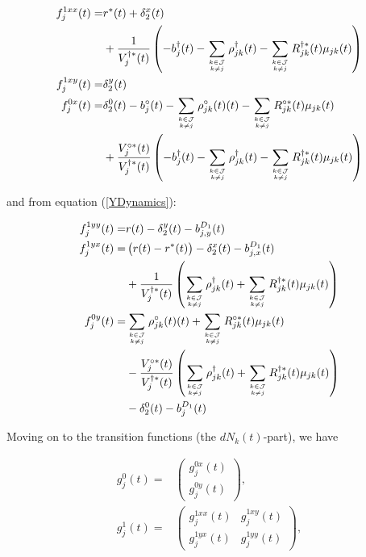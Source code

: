 \documentclass{article}
\newcommand{\1}[1]{\mathbbm{1}_{\left\lbrace #1 \right\rbrace}}
\theoremstyle{break}
\theoremstyle{remark}
\numberwithin{equation}{section}
\begin{document}
\begin{appendices}
\begin{align*}
	f_j^{1xx}(t) =& r^*(t) + \delta_2^x(t) \\
	&+ \frac{1}{V_j^{\dagger *}(t)} \left( -b_j^\dagger(t) - \sum_{k \in \mathcal{J} \atop k \neq j} \rho_{jk}^\dagger(t) - \sum_{k \in \mathcal{J} \atop k \neq j} R_{jk}^{\dagger*}(t) \mu_{jk}(t) \right) \\
	f_j^{1xy}(t) =& \delta_2^y(t)\\
	f_j^{0x}(t) =& \delta_2^0(t) - b_j^\circ(t) - \sum_{k \in \mathcal{J} \atop k \neq j} \rho_{jk}^\circ(t)(t) - \sum_{k \in \mathcal{J} \atop k \neq j} R_{jk}^{\circ*}(t) \mu_{jk}(t) \\
	&+ \frac{V_j^{\circ *}(t)}{V_j^{\dagger *}(t)} \left( -b_j^\dagger(t) - \sum_{k \in \mathcal{J} \atop k \neq j} \rho_{jk}^\dagger(t) - \sum_{k \in \mathcal{J} \atop k \neq j} R_{jk}^{\dagger*}(t) \mu_{jk}(t) \right)
\end{align*}

and from equation (\ref{YDynamics}):

\begin{align*}
	f_j^{1yy}(t) =& r(t) - \delta_2^y(t) - b_{j,y}^{D_1}(t) \\
	f_j^{1yx}(t) =& \left( r(t) - r^*(t) \right) - \delta_2^x(t) - b_{j,x}^{D_1}(t) \\
	&+ \frac{1}{V_j^{\dagger *}(t)} \left( \sum_{k \in \mathcal{J} \atop k \neq j} \rho_{jk}^\dagger(t) + \sum_{k \in \mathcal{J} \atop k \neq j} R_{jk}^{\dagger*}(t) \mu_{jk}(t) \right) \\
	f_j^{0y}(t) =& \sum_{k \in \mathcal{J} \atop k \neq j} \rho_{jk}^\circ(t)(t) + \sum_{k \in \mathcal{J} \atop k \neq j} R_{jk}^{\circ*}(t) \mu_{jk}(t) \\
	&- \frac{V_j^{\circ *}(t)}{V_j^{\dagger *}(t)} \left( \sum_{k \in \mathcal{J} \atop k \neq j} \rho_{jk}^\dagger(t) + \sum_{k \in \mathcal{J} \atop k \neq j} R_{jk}^{\dagger*}(t) \mu_{jk}(t) \right) \\
	&- \delta_2^0(t) - b_j^{D_1} (t)
\end{align*}

Moving on to the transition functions (the $dN_k(t)$-part), we have

\begin{align*}
	g_j^0(t) =&
	\begin{pmatrix}
		g_j^{0x}(t) \\
		g_j^{0y}(t) 
	\end{pmatrix}, \\
	g_j^1(t) =&
	\begin{pmatrix}
		g_j^{1xx}(t) & g_j^{1xy}(t) \\
		g_j^{1yx}(t) & g_j^{1yy}(t)
	\end{pmatrix},
\end{align*}


\end{appendices}
\end{document}
